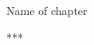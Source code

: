\begin{chapter}{Name of chapter}





\begin{center}
     ***
 \end{center}



















\end{chapter}